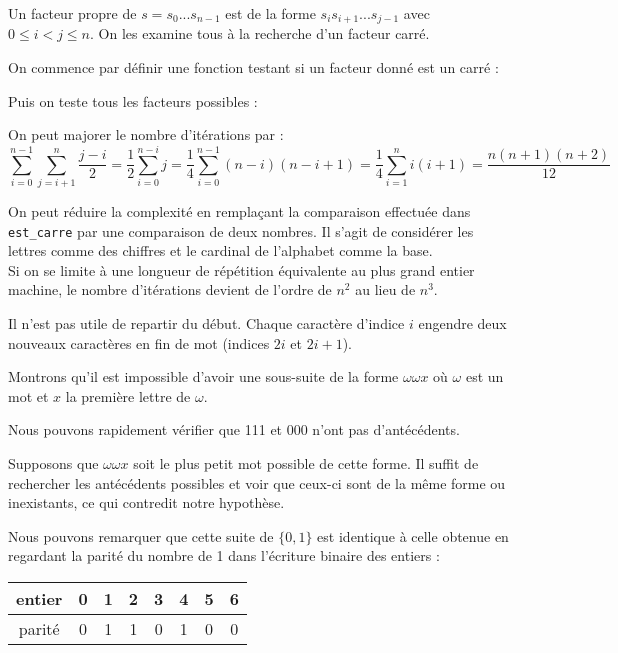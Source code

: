 \Q
Un facteur propre de $s=s_0...s_{n-1}$ est de la forme $s_is_{i+1}...s_{j-1}$ avec $0\leq i < j \leq n$. On les examine tous à la recherche d'un facteur carré.
\medskip

On commence par définir une fonction testant si un facteur donné est un carré :



Puis on teste tous les facteurs possibles :



On peut majorer le nombre d'itérations par :
\[
\sum_{i=0}^{n-1}\sum_{j=i+1}^n\frac{j-i}{2}=\frac{1}{2}\sum_{i=0}^{n-i}j=\frac{1}{4}\sum_{i=0}^{n-1}(n-i)(n-i+1)=\frac{1}{4}\sum_{i=1}^ni(i+1)=\frac{n(n+1)(n+2)}{12}
\]

On peut réduire la complexité en remplaçant la comparaison effectuée dans \texttt{est\_carre} par une comparaison de deux nombres. Il s'agit de considérer les lettres comme des chiffres et le cardinal de l'alphabet comme la base.\\
Si on se limite à une longueur de répétition équivalente au plus grand entier machine, le nombre d'itérations devient de l'ordre de $n^2$ au lieu de $n^3$.

\Q
Il n'est pas utile de repartir du début. Chaque caractère d'indice $i$ engendre deux nouveaux caractères en fin de mot (indices $2i$ et $2i+1$).



Montrons qu'il est impossible d'avoir une sous-suite de la forme $\omega\omega x$ où $\omega$ est un mot et $x$ la première lettre de $\omega$.
\smallskip

Nous pouvons rapidement vérifier que 111 et 000 n'ont pas d'antécédents.
\smallskip

Supposons que $\omega\omega x$ soit le plus petit mot possible de cette forme. Il suffit de rechercher les antécédents possibles et voir que ceux-ci sont de la même forme ou inexistants, ce qui contredit notre hypothèse.
\medskip

Nous pouvons remarquer que cette suite de $\{0,1\}$ est identique à celle obtenue en regardant la parité du nombre de 1 dans l'écriture binaire des entiers :
\smallskip

\begin{tabular}{|c|c|c|c|c|c|c|c|}
    \hline
    entier & 0 & 1 & 2 & 3 & 4 & 5 & 6\\
    \hline
    parité & 0 & 1 & 1 & 0 & 1 & 0 & 0\\
    \hline
\end{tabular}


